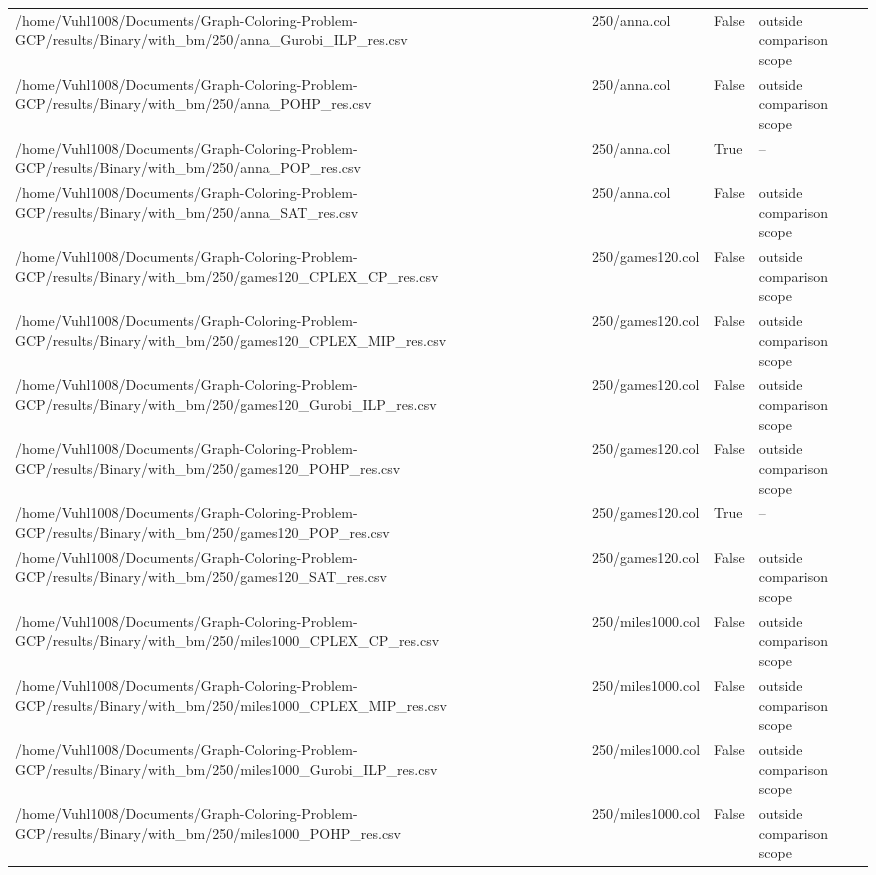 \begin{table}[htbp]
\begin{tabular}{llll}
/home/Vuhl1008/Documents/Graph-Coloring-Problem-GCP/results/Binary/with\_bm/250/anna\_Gurobi\_ILP\_res.csv & 250/anna.col & False & outside comparison scope \\
/home/Vuhl1008/Documents/Graph-Coloring-Problem-GCP/results/Binary/with\_bm/250/anna\_POHP\_res.csv & 250/anna.col & False & outside comparison scope \\
/home/Vuhl1008/Documents/Graph-Coloring-Problem-GCP/results/Binary/with\_bm/250/anna\_POP\_res.csv & 250/anna.col & True & -- \\
/home/Vuhl1008/Documents/Graph-Coloring-Problem-GCP/results/Binary/with\_bm/250/anna\_SAT\_res.csv & 250/anna.col & False & outside comparison scope \\
/home/Vuhl1008/Documents/Graph-Coloring-Problem-GCP/results/Binary/with\_bm/250/games120\_CPLEX\_CP\_res.csv & 250/games120.col & False & outside comparison scope \\
/home/Vuhl1008/Documents/Graph-Coloring-Problem-GCP/results/Binary/with\_bm/250/games120\_CPLEX\_MIP\_res.csv & 250/games120.col & False & outside comparison scope \\
/home/Vuhl1008/Documents/Graph-Coloring-Problem-GCP/results/Binary/with\_bm/250/games120\_Gurobi\_ILP\_res.csv & 250/games120.col & False & outside comparison scope \\
/home/Vuhl1008/Documents/Graph-Coloring-Problem-GCP/results/Binary/with\_bm/250/games120\_POHP\_res.csv & 250/games120.col & False & outside comparison scope \\
/home/Vuhl1008/Documents/Graph-Coloring-Problem-GCP/results/Binary/with\_bm/250/games120\_POP\_res.csv & 250/games120.col & True & -- \\
/home/Vuhl1008/Documents/Graph-Coloring-Problem-GCP/results/Binary/with\_bm/250/games120\_SAT\_res.csv & 250/games120.col & False & outside comparison scope \\
/home/Vuhl1008/Documents/Graph-Coloring-Problem-GCP/results/Binary/with\_bm/250/miles1000\_CPLEX\_CP\_res.csv & 250/miles1000.col & False & outside comparison scope \\
/home/Vuhl1008/Documents/Graph-Coloring-Problem-GCP/results/Binary/with\_bm/250/miles1000\_CPLEX\_MIP\_res.csv & 250/miles1000.col & False & outside comparison scope \\
/home/Vuhl1008/Documents/Graph-Coloring-Problem-GCP/results/Binary/with\_bm/250/miles1000\_Gurobi\_ILP\_res.csv & 250/miles1000.col & False & outside comparison scope \\
/home/Vuhl1008/Documents/Graph-Coloring-Problem-GCP/results/Binary/with\_bm/250/miles1000\_POHP\_res.csv & 250/miles1000.col & False & outside comparison scope \\

\end{tabular}
\end{table}
